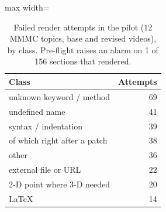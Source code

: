 \begin{table}[!htbp]\centering\small
\caption{Failed render attempts in the pilot (12 MMMC topics, base and revised videos), by class. Pre-flight raises an alarm on 1 of 156 sections that rendered.}\label{tab:failures}
\begin{adjustbox}{max width=\linewidth}\begin{tabular}{lr}\toprule Class & Attempts\\\midrule
unknown keyword / method & 69 \\
undefined name & 41 \\
syntax / indentation & 39 \\
\quad of which right after a patch & 38 \\
other & 36 \\
external file or URL & 22 \\
2-D point where 3-D needed & 20 \\
LaTeX & 14 \\
\bottomrule\end{tabular}\end{adjustbox}
\end{table}
